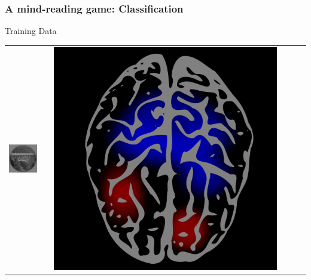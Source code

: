 \documentclass{beamer}
\begin{document}
{

}

\begin{frame}
\frametitle{A mind-reading game: Classification}
\begin{center}
Training Data
\\
\begin{tabular}{ccc||ccc}
\hline
\includegraphics[scale = .26]{img1.png} & \hspace{0.2in} & \includegraphics[scale = 0.035]{brain1.png} &

\end{tabular}
\end{center}
\end{frame}
\end{document}
